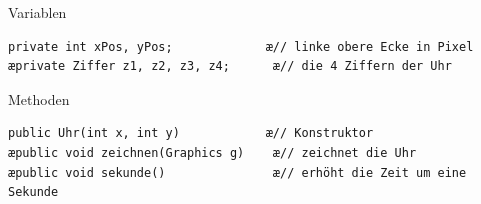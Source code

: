 \begin{compactenum}[a)]
\item Variablen

\begin{lstlisting}
private int xPos, yPos;             æ// linke obere Ecke in Pixel
æprivate Ziffer z1, z2, z3, z4;      æ// die 4 Ziffern der Uhr
\end{lstlisting}

\item Methoden

\begin{lstlisting}
public Uhr(int x, int y)            æ// Konstruktor
æpublic void zeichnen(Graphics g)    æ// zeichnet die Uhr
æpublic void sekunde()               æ// erhöht die Zeit um eine Sekunde
\end{lstlisting}
\end{compactenum}



